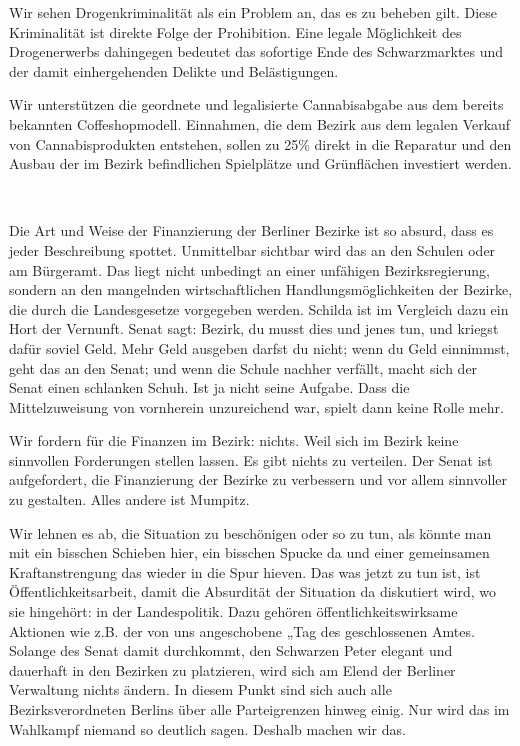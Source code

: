 \documentclass[a4paper,10pt]{article}
\newcommand{\mysection}[1]{{\vspace{1cm}\noindent\color{gray}{\ttfamily\LARGE\raggedright #1}\\\medskip}}
\newcommand{\abschnitt}[2]{%
\mysection{\raggedright #1}%
\begin{figure}[t]%
\vspace*{-2.7cm}%
\hspace*{-2.1cm}%
\texttt{[image: images/blog/small/\#2]} %
\end{figure}%
}
\begin{document}
Wir sehen Drogenkriminalität als ein Problem an, das es zu beheben gilt.
Diese Kriminalität ist direkte Folge der Prohibition. Eine legale
Möglichkeit des Drogenerwerbs dahingegen bedeutet das sofortige Ende des
Schwarzmarktes und der damit einhergehenden Delikte und Belästigungen.

Wir unterstützen die geordnete und legalisierte Cannabisabgabe aus dem
bereits bekannten Coffeshopmodell. Einnahmen, die dem Bezirk aus dem
legalen Verkauf von Cannabisprodukten entstehen, sollen zu 25\% direkt
in die Reparatur und den Ausbau der im Bezirk befindlichen Spielplätze
und Grünflächen investiert werden.

\mysection{Finanzen}

Die Art und Weise der Finanzierung der Berliner Bezirke ist so absurd,
dass es jeder Beschreibung spottet. Unmittelbar sichtbar wird das an den
Schulen oder am Bürgeramt. Das liegt nicht unbedingt an einer unfähigen
Bezirksregierung, sondern an den mangelnden wirtschaftlichen
Handlungsmöglichkeiten der Bezirke, die durch die Landesgesetze
vorgegeben werden. Schilda ist im Vergleich dazu ein Hort der Vernunft.
Senat sagt: Bezirk, du musst dies und jenes tun, und kriegst dafür
soviel Geld. Mehr Geld ausgeben darfst du nicht; wenn du Geld einnimmst,
geht das an den Senat; und wenn die Schule nachher verfällt, macht sich
der Senat einen schlanken Schuh. Ist ja nicht seine Aufgabe. Dass die
Mittelzuweisung von vornherein unzureichend war, spielt dann keine Rolle
mehr.

Wir fordern für die Finanzen im Bezirk: nichts. Weil sich im Bezirk
keine sinnvollen Forderungen stellen lassen. Es gibt nichts zu
verteilen. Der Senat ist aufgefordert, die Finanzierung der Bezirke zu
verbessern und vor allem sinnvoller zu gestalten. Alles andere ist
Mumpitz.

Wir lehnen es ab, die Situation zu beschönigen oder so zu tun, als
könnte man mit ein bisschen Schieben hier, ein bisschen Spucke da und
einer gemeinsamen Kraftanstrengung das wieder in die Spur hieven. Das
was jetzt zu tun ist, ist Öffentlichkeitsarbeit, damit die Absurdität
der Situation da diskutiert wird, wo sie hingehört: in der
Landespolitik. Dazu gehören öffentlichkeitswirksame Aktionen wie z.B.
der von uns angeschobene „Tag des geschlossenen Amtes{\grqq}. Solange des
Senat damit durchkommt, den Schwarzen Peter elegant und dauerhaft in den
Bezirken zu platzieren, wird sich am Elend der Berliner Verwaltung
nichts ändern. In diesem Punkt sind sich auch alle Bezirksverordneten
Berlins über alle Parteigrenzen hinweg einig. Nur wird das im Wahlkampf
niemand so deutlich sagen. Deshalb machen wir das.
\end{document}
